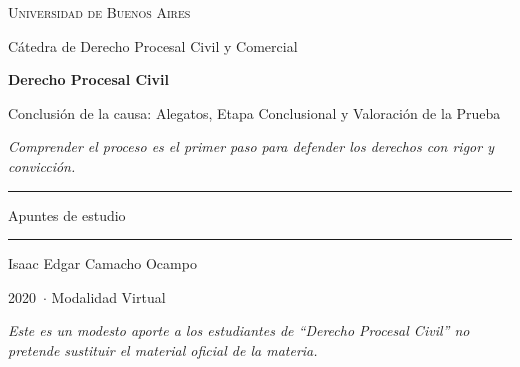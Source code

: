 \documentclass[12pt,oneside]{book}
\newcommand{\universidad}{Universidad de Buenos Aires}
\newcommand{\carrera}{Cátedra de Derecho Procesal Civil y Comercial}
\newcommand{\materia}{Derecho Procesal Civil}
\newcommand{\autor}{Isaac Edgar Camacho Ocampo}
\newcommand{\anio}{2020}
\begin{document}
\begin{titlepage}

\thispagestyle{empty}

\begin{center}

\vspace*{1cm}

{\large \textsc{\universidad}}

\vspace{0.3cm}

{\large \carrera}

\vspace{3cm}

{\Huge \textbf{\materia}}

\vspace{1cm}

{\LARGE Conclusión de la causa: Alegatos, Etapa Conclusional y Valoración de la Prueba}

\vspace{0.8cm}

\textit{Comprender el proceso es el primer paso para defender los derechos con rigor y convicción.}

\vspace{1.2cm}

\rule{0.70\textwidth}{0.5pt}

\vspace{0.5cm}

{\large Apuntes de estudio}

\vspace{0.5cm}

\rule{0.70\textwidth}{0.5pt}

\vfill

{\large \autor}

\vspace{0.3cm}

{\large \anio\ $\cdot$ Modalidad Virtual}

\end{center}

\vfill

\begin{flushleft}
\textit{Este es un modesto aporte a los estudiantes de ``Derecho Procesal Civil'' no pretende sustituir el material oficial de la materia.}
\end{flushleft}

\end{titlepage}
\end{document}
